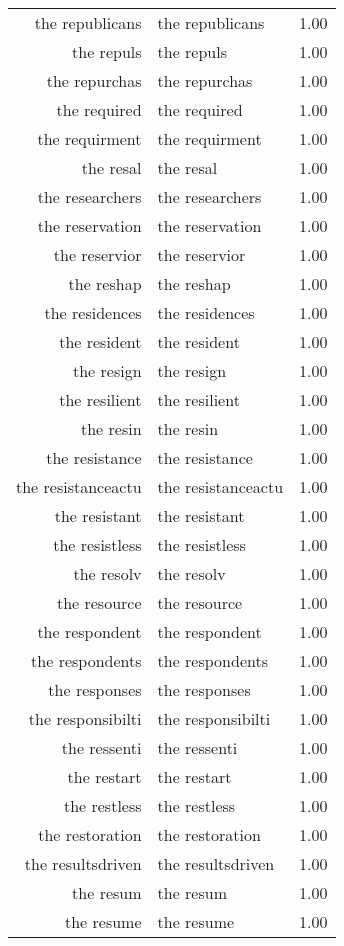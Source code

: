 \begin{table}[ht]
\begin{tabular}{rlr}
  the republicans & the republicans & 1.00 \\ 
  the repuls & the repuls & 1.00 \\ 
  the repurchas & the repurchas & 1.00 \\ 
  the required & the required & 1.00 \\ 
  the requirment & the requirment & 1.00 \\ 
  the resal & the resal & 1.00 \\ 
  the researchers & the researchers & 1.00 \\ 
  the reservation & the reservation & 1.00 \\ 
  the reservior & the reservior & 1.00 \\ 
  the reshap & the reshap & 1.00 \\ 
  the residences & the residences & 1.00 \\ 
  the resident & the resident & 1.00 \\ 
  the resign & the resign & 1.00 \\ 
  the resilient & the resilient & 1.00 \\ 
  the resin & the resin & 1.00 \\ 
  the resistance & the resistance & 1.00 \\ 
  the resistanceactu & the resistanceactu & 1.00 \\ 
  the resistant & the resistant & 1.00 \\ 
  the resistless & the resistless & 1.00 \\ 
  the resolv & the resolv & 1.00 \\ 
  the resource & the resource & 1.00 \\ 
  the respondent & the respondent & 1.00 \\ 
  the respondents & the respondents & 1.00 \\ 
  the responses & the responses & 1.00 \\ 
  the responsibilti & the responsibilti & 1.00 \\ 
  the ressenti & the ressenti & 1.00 \\ 
  the restart & the restart & 1.00 \\ 
  the restless & the restless & 1.00 \\ 
  the restoration & the restoration & 1.00 \\ 
  the resultsdriven & the resultsdriven & 1.00 \\ 
  the resum & the resum & 1.00 \\ 
  the resume & the resume & 1.00 \\ 

\end{tabular}
\end{table}
